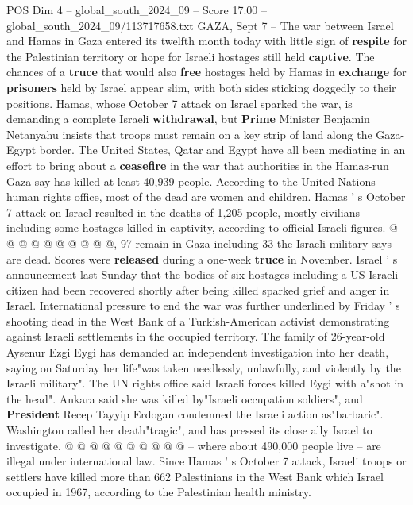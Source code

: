 \begin{textsample}{POS Dim 4 – global\_south\_2024\_09 – Score 17.00 – global\_south\_2024\_09/113717658.txt}  \label{ex:f4_pos_280}
GAZA, Sept 7 -- The war between Israel and Hamas in Gaza entered its twelfth month today with little sign of \textbf{respite} for the Palestinian territory or hope for Israeli hostages still held \textbf{captive}.
The chances of a \textbf{truce} that would also \textbf{free} hostages held by Hamas in \textbf{exchange} for \textbf{prisoners} held by Israel appear slim, with both sides sticking doggedly to their positions.
Hamas, whose October 7 attack on Israel sparked the war, is demanding a complete Israeli \textbf{withdrawal}, but \textbf{Prime} Minister Benjamin Netanyahu insists that troops must remain on a key strip of land along the Gaza-Egypt border.
The United States, Qatar and Egypt have all been mediating in an effort to bring about a \textbf{ceasefire} in the war that authorities in the Hamas-run Gaza say has killed at least 40,939 people.
According to the United Nations human rights office, most of the dead are women and children.
Hamas ' s October 7 attack on Israel resulted in the deaths of 1,205 people, mostly civilians including some hostages killed in captivity, according to official Israeli figures. @ @ @ @ @ @ @ @ @ @, 97 remain in Gaza including 33 the Israeli military says are dead.
Scores were \textbf{released} during a one-week \textbf{truce} in November.
Israel ' s announcement last Sunday that the bodies of six hostages including a US-Israeli citizen had been recovered shortly after being killed sparked grief and anger in Israel.
International pressure to end the war was further underlined by Friday ' s shooting dead in the West Bank of a Turkish-American activist demonstrating against Israeli settlements in the occupied territory.
The family of 26-year-old Aysenur Ezgi Eygi has demanded an independent investigation into her death, saying on Saturday her life"was taken needlessly, unlawfully, and violently by the Israeli military".
The UN rights office said Israeli forces killed Eygi with a"shot in the head".
Ankara said she was killed by"Israeli occupation soldiers", and \textbf{President} Recep Tayyip Erdogan condemned the Israeli action as"barbaric".
Washington called her death"tragic", and has pressed its close ally Israel to investigate. @ @ @ @ @ @ @ @ @ @ -- where about 490,000 people live -- are illegal under international law.
Since Hamas ' s October 7 attack, Israeli troops or settlers have killed more than 662 Palestinians in the West Bank which Israel occupied in 1967, according to the Palestinian health ministry.

\end{textsample}
